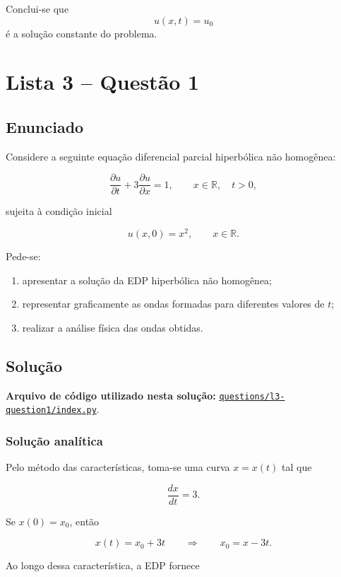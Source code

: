 \documentclass[
    12pt,
    oneside,
    a4paper,
    english,
    brazilian,
    chapter=TITLE,
    sumario=tradicional
]{abntex2}
\newcommand{\linkcodigo}[2]{%
    \par\noindent\textbf{Arquivo de código utilizado nesta solução: }
    \href{#1}{\nolinkurl{#2}}.\par
}
\begin{document}
Conclui-se que
\[
    \boxed{u(x,t)=u_0}
\]
é a solução constante do problema.

\newpage

\chapter{Lista 3 -- Questão 1}

\section{Enunciado}

Considere a seguinte equação diferencial parcial hiperbólica não homogênea:

\[
    \frac{\partial u}{\partial t}
    +
    3\frac{\partial u}{\partial x}
    =
    1,
    \qquad x \in \mathbb{R}, \quad t>0,
\]

sujeita à condição inicial

\[
    u(x,0)=x^2,
    \qquad x\in\mathbb{R}.
\]

Pede-se:

\begin{enumerate}
    \item apresentar a solução da EDP hiperbólica não homogênea;
    \item representar graficamente as ondas formadas para diferentes valores de $t$;
    \item realizar a análise física das ondas obtidas.
\end{enumerate}

\section{Solução}

\linkcodigo
{https://github.com/kauanpecanha/Faculdade/blob/master/MEDO2/trabalho1/questions/l3-question1/index.py}
{questions/l3-question1/index.py}

\subsection{Solução analítica}

Pelo método das características, toma-se uma curva $x=x(t)$ tal que

\[
    \frac{dx}{dt}=3.
\]

Se $x(0)=x_0$, então

\[
    x(t)=x_0+3t
    \qquad\Longrightarrow\qquad
    x_0=x-3t.
\]

Ao longo dessa característica, a EDP fornece
\end{document}
